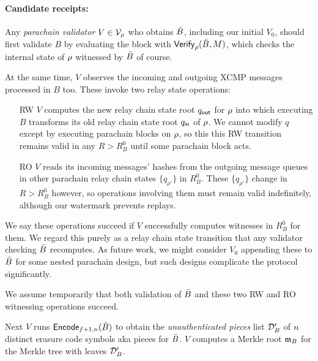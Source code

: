 \smallskip\paragraph{Candidate receipts:}

Any {\em parachain validator} $V \in \mathcal{V}_{\rho}$ who obtains $\bar{B}$, including our initial $V_0$, should first validate $B$ by evaluating the block with $\mathsf{Verify}_{\rho}(\bar{B},M)$, which checks the internal state of $\rho$ witnessed by $\bar{B}$ of course.  

At the same time, $V$ observes the incoming and outgoing XCMP messages processed in $B$ too.  These invoke two relay state operations:
\begin{itemize}
\item[RW] $V$ computes the new relay chain state root $q_{\mathsf{out}}$ for $\rho$ into which executing $B$ transforms its old relay chain state root $q_{\mathsf{in}}$ of $\rho$.  We cannot modify $q$ except by executing parachain blocks on $\rho$, so this this RW transition remains valid in any $R > R^0_B$ until some parachain block acts.
\item[RO] $V$ reads its incoming messages' hashes from the outgoing message queues in other parachain relay chain states $\{ q_{\rho'} \}$ in $R^0_B$.  These $\{ q_{\rho'} \}$ change in $R > R^0_B$ however, so operations involving them must remain valid indefinitely, although our watermark prevents replays.  
\end{itemize}
We say these operations succeed if $V$ successfully computes witnesses in $R^0_B$ for them.  We regard this purely as a relay chain state transition that any validator checking $\bar{B}$ recomputes.  As future work, we might consider $V_0$ appending these to $\bar{B}$ for some nested parachain design, but such designs complicate the protocol significantly.  

We assume temporarily that both validation of $\bar{B}$ and these two RW and RO witnessing operations succeed.

Next $V$ runs $\mathsf{Encode}_{f+1,n}(\bar{B})$ to obtain the {\em unauthenticated pieces} list $\mathcal{D}'_B$ of $n$ distinct erasure code symbols aka pieces for $\bar{B}$.  $V$ computes a Merkle root $\mathfrak{m}_B$ for the Merkle tree with leaves $\mathcal{D}'_B$.  

